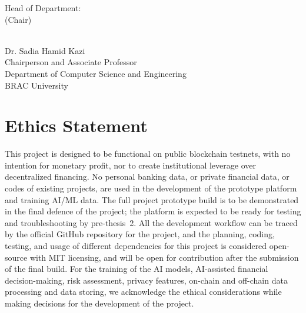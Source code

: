\documentclass[12pt, a4paper]{report}
\begin{document}
\begin{flushleft}
Head of Department:\\
(Chair)
\end{flushleft}

\begin{flushright}
\vspace{-0.5cm}
\hrulefill\\
Dr. Sadia Hamid Kazi\\
Chairperson and Associate Professor\\
Department of Computer Science and Engineering\\
BRAC University
\end{flushright}

\vfill\null

\newpage
\thispagestyle{empty}

\chapter*{Ethics Statement}
{}

This project is designed to be functional on public blockchain testnets, with no intention for monetary profit, nor to create institutional leverage over decentralized financing. No personal banking data, or private financial data, or codes of existing projects, are used in the development of the prototype platform and training AI/ML data. The full project prototype build is to be demonstrated in the final defence of the project; the platform is expected to be ready for testing and troubleshooting by pre-thesis~2. All the development workflow can be traced by the official GitHub repository for the project, and the planning, coding, testing, and usage of different dependencies for this project is considered open-source with MIT licensing, and will be open for contribution after the submission of the final build. For the training of the AI models, AI-assisted financial decision-making, risk assessment, privacy features, on-chain and off-chain data processing and data storing, we acknowledge the ethical considerations while making decisions for the development of the project.

\newpage
\thispagestyle{empty}
\end{document}
